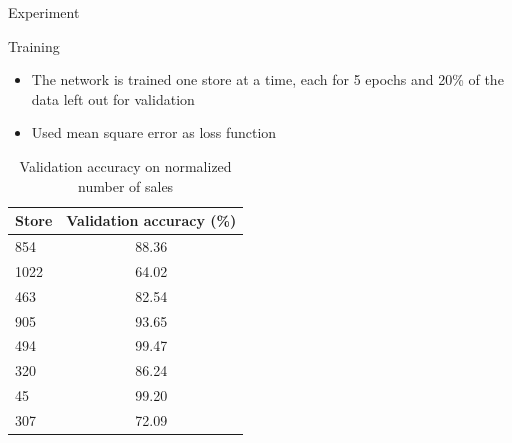 \documentclass[10pt]{beamer}
\begin{document}
\begin{frame}{Experiment}
    \begin{alertblock}{Training}
    \begin{itemize}
        \item The network is trained one store at a time, each for 5 epochs and 20\% of the data left out for validation
        \item Used mean square error as loss function
    \end{itemize}
    \end{alertblock}

    \begin{table}
        \begin{tabular}{lc}
            \toprule
            Store  & Validation accuracy (\%)\\
            \toprule
            854    & 88.36 \\
            1022   & 64.02 \\
            463    & 82.54 \\
            905    & 93.65 \\
            494    & 99.47 \\
            320    & 86.24 \\
            45     & 99.20\\
            307    & 72.09\\
            \bottomrule
        \end{tabular}
        \caption{Validation accuracy on normalized number of sales}
    \end{table}
\end{frame}
\end{document}
